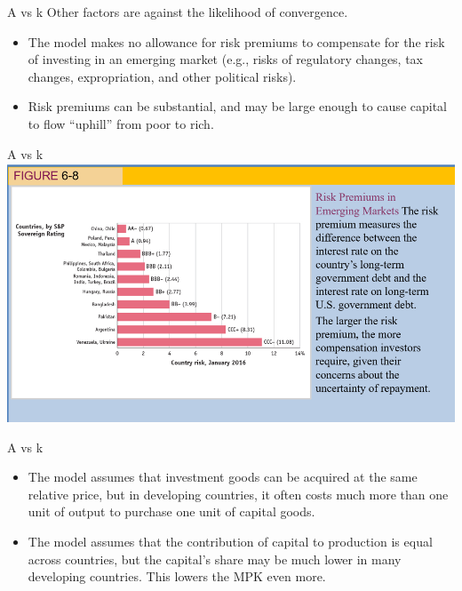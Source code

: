 \documentclass[
  ignorenonframetext,
]{beamer}
\providecommand{\tightlist}{%
  \setlength{\itemsep}{0pt}\setlength{\parskip}{0pt}}\usepackage{longtable,booktabs,array}
\begin{document}
\begin{frame}{A vs k}
\label{a-vs-k-4}
Other factors are against the likelihood of convergence.

\begin{itemize}
\tightlist
\item
  The model makes no allowance for risk premiums to compensate for the
  risk of investing in an emerging market (e.g., risks of regulatory
  changes, tax changes, expropriation, and other political risks).
\item
  Risk premiums can be substantial, and may be large enough to cause
  capital to flow ``uphill'' from poor to rich.
\end{itemize}
\end{frame}

\begin{frame}{A vs k}
\label{a-vs-k-5}
\includegraphics{pic5.png}
\end{frame}

\begin{frame}{A vs k}
\label{a-vs-k-6}
\begin{itemize}
\item
  The model assumes that investment goods can be acquired at the same
  relative price, but in developing countries, it often costs much more
  than one unit of output to purchase one unit of capital goods.
\item
  The model assumes that the contribution of capital to production is
  equal across countries, but the capital's share may be much lower in
  many developing countries. This lowers the MPK even more.
\end{itemize}
\end{frame}
\end{document}
